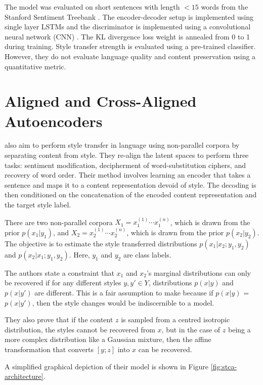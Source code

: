 The model was evaluated on short sentences with length $<15$ words from the Stanford Sentiment Treebank \citep{socher2013recursive}. The encoder-decoder setup is implemented using single layer LSTMs and the discriminator is implemented using a convolutional neural network (CNN) \citep{hu2016harnessing}. The KL divergence loss weight is annealed from 0 to 1 during training. Style transfer strength is evaluated using a pre-trained classifier. However, they do not evaluate language quality and content preservation using a quantitative metric.


\section{Aligned and Cross-Aligned Autoencoders}

\cite{shen2017style} also aim to perform style transfer in language using non-parallel corpora by separating content from style. They re-align the latent spaces to perform three tasks: sentiment modification, decipherment of word-substitution ciphers, and recovery of word order. Their method involves learning an encoder that takes a sentence and maps it to a content representation devoid of style. The decoding is then conditioned on the concatenation of the encoded content representation and the target style label.

There are two non-parallel corpora $X_1 = {x_1^{(1)} \cdots x_1^{(n)}}$, which is drawn from the prior $p(x_1|y_1)$, and $X_2 = {x_2^{(1)} \cdots x_2^{(n)}}$, which is drawn from the prior $p(x_2|y_2)$. The objective is to estimate the style transferred distributions $p(x_1|x_2;y_1,y_2)$ and $p(x_2|x_1;y_1,y_2)$. Here, $y_1$ and $y_2$ are class labels.

The authors state a constraint that $x_1$ and $x_2$'s marginal distributions can only be recovered if for any different styles $y, y' \in Y$, distributions $p(x|y)$ and $p(x|y')$ are different. This is a fair assumption to make because if $p(x|y)$ = $p(x|y')$, then the style changes would be indiscernible to a model.

They also prove that if the content $z$ is sampled from a centred isotropic distribution, the styles cannot be recovered from $x$, but in the case of $z$ being a more complex distribution like a Gaussian mixture, then the affine transformation that converts $[y; z]$ into $x$ can be recovered.

A simplified graphical depiction of their model is shown in Figure \ref{fig:stca-architecture}.

